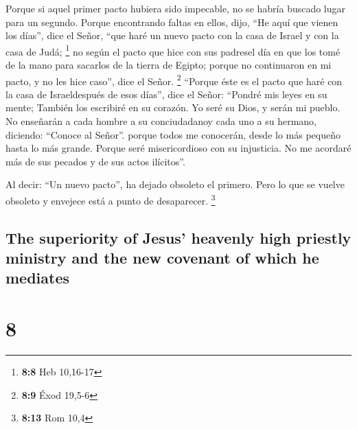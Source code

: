 \begin{paracol}{2}
 Porque si aquel primer pacto hubiera sido impecable, no
se habría buscado lugar para un segundo.  Porque
encontrando faltas en ellos, dijo, ``He aquí que vienen los días'', dice
el Señor, ``que haré un nuevo pacto con la casa de Israel y con la casa
de Judá; \footnote{\textbf{8:8} Heb 10,16-17}  no según el
pacto que hice con sus padresel día en que los tomé de la mano para
sacarlos de la tierra de Egipto; porque no continuaron en mi pacto, y no
les hice caso'', dice el Señor. \footnote{\textbf{8:9} Éxod 19,5-6}
 ``Porque éste es el pacto que haré con la casa de
Israeldespués de esos días'', dice el Señor: ``Pondré mis leyes en su
mente; También los escribiré en su corazón. Yo seré su Dios, y serán mi
pueblo.  No enseñarán a cada hombre a su conciudadanoy
cada uno a su hermano, diciendo: ``Conoce al Señor''. porque todos me
conocerán, desde lo más pequeño hasta lo más grande. 
Porque seré misericordioso con su injusticia. No me acordaré más de sus
pecados y de sus actos ilícitos''.

 Al decir: ``Un nuevo pacto'', ha dejado obsoleto el
primero. Pero lo que se vuelve obsoleto y envejece está a punto de
desaparecer. \footnote{\textbf{8:13} Rom 10,4}

\switchcolumn
\begin{otherlanguage}{english}

\hypertarget{the-superiority-of-jesus-heavenly-high-priestly-ministry-and-the-new-covenant-of-which-he-mediates}{%
\subsection{The superiority of Jesus' heavenly high priestly ministry
and the new covenant of which he
mediates}\label{the-superiority-of-jesus-heavenly-high-priestly-ministry-and-the-new-covenant-of-which-he-mediates}}

\hypertarget{section-15}{%
\section{8}\label{section-15}}


\end{otherlanguage}
\end{paracol}
